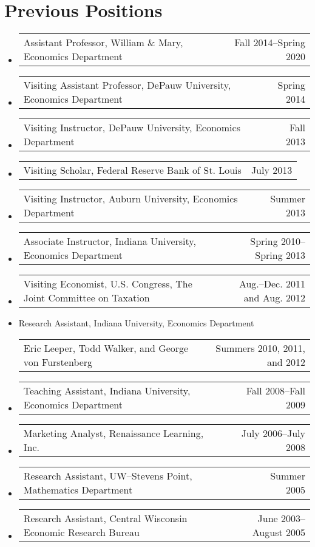 \documentclass[10pt,letterpaper,en-US]{article}
\makeatletter
\newcommand{\itemrow}[2]
{\begin{tabular*}{\linewidth}{l@{\extracolsep{\fill}}r}
	#1 & #2 \\
\end{tabular*}}
\makeatother
\begin{document}
\section*{Previous Positions}
\begin{itemize}\allowbreak
\item \itemrow{Assistant Professor, William \& Mary, Economics Department}{Fall 2014--Spring 2020}
\item \itemrow{Visiting Assistant Professor, DePauw University, Economics Department}{Spring 2014}
\item \itemrow{Visiting Instructor, DePauw University, Economics Department}{Fall 2013}
\item \itemrow{Visiting Scholar, Federal Reserve Bank of St. Louis}{July 2013}
\item \itemrow{Visiting Instructor, Auburn University, Economics Department}{Summer 2013}
\item \itemrow{Associate Instructor, Indiana University, Economics Department}{Spring 2010--Spring 2013}
\item \itemrow{Visiting Economist, U.S. Congress, The Joint Committee on Taxation}{Aug.--Dec. 2011 and Aug. 2012}
\item Research Assistant, Indiana University, Economics Department \\
        \itemrow{\hspace{.25in}Eric Leeper, Todd Walker, and George von Furstenberg}{Summers 2010, 2011, and 2012}
\item \itemrow{Teaching Assistant, Indiana University, Economics Department}{Fall 2008--Fall 2009}
\item \itemrow{Marketing Analyst, Renaissance Learning, Inc.}{July 2006--July 2008}
\item \itemrow{Research Assistant, UW--Stevens Point, Mathematics Department}{Summer 2005}
\item \itemrow{Research Assistant, Central Wisconsin Economic Research Bureau}{June 2003--August 2005}
\end{itemize}
\end{document}

